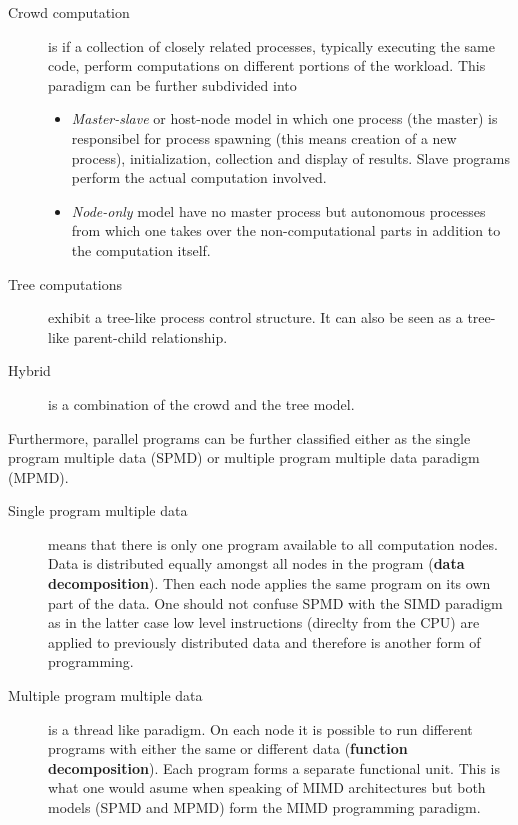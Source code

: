 \begin{description}
\item[Crowd computation] is if a collection of closely related
  processes, typically executing the same code, perform computations
  on different portions of the workload. This paradigm can be further
  subdivided into
  \begin{itemize}
  \item \textit{Master-slave} or host-node model in which one process (the
    master) is responsibel for process spawning (this means creation
    of a new process), initialization, collection and display of
    results. Slave programs perform the actual computation involved.
  \item \textit{Node-only} model have no master process but autonomous
    processes from which one takes over the non-computational parts
    in addition to the computation itself.
  \end{itemize}
\item[Tree computations] exhibit a tree-like process control
  structure. It can also be seen as a tree-like parent-child
  relationship.
\item[Hybrid] is a combination of the crowd and the tree model.
\end{description}

Furthermore, parallel programs can be further classified either as the
single program multiple data (SPMD) or multiple program multiple data
paradigm (MPMD). 

\begin{description}
\item[Single program multiple data] means that there is only one
  program available to all computation nodes. Data is distributed
  equally amongst all nodes in the program (\textbf{data
    decomposition}). Then each node applies the
  same program on its own part of the data. One should not confuse
  SPMD with the SIMD paradigm as in the latter case low level
  instructions (direclty from the CPU) are applied to previously
  distributed data and therefore is another form of programming.
\item[Multiple program multiple data] is a thread like
  paradigm. On each node it is possible to run different programs with
  either the same or different data (\textbf{function
    decomposition}). Each program forms a separate
  functional unit. This is what one would asume when speaking of MIMD
  architectures but both models (SPMD and MPMD) form the MIMD
  programming paradigm. 
\end{description}


